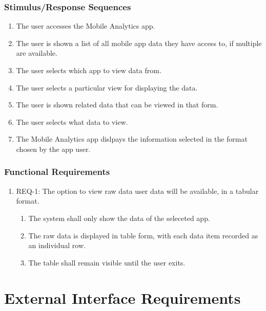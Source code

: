 \documentclass[12pt,oneside,letterpaper]{article}
\begin{document}
\subsubsection{Stimulus/Response Sequences}
\begin{enumerate}
\item The user accesses the Mobile Analytics app.
\item The user is shown a list of all mobile app data they have access to, if multiple are available.
\item The user selects which app to view data from.
\item The user selects a particular view for displaying the data.
\item The user is shown related data that can be viewed in that form.
\item The user selects what data to view.
\item The Mobile Analytics app dislpays the information selected in the format chosen by the app user.
\end{enumerate}

\subsubsection{Functional Requirements}
\begin{enumerate}
\item REQ-1: The option to view raw data user data will be available, in a tabular format.
\begin{enumerate}
\item The system shall only show the data of the seleceted app.
\item The raw data is displayed in table form, with each data item recorded as an individual row.
\item The table shall remain visible until the user exits.
\end{enumerate}
\end{enumerate}

\clearpage
\section{External Interface Requirements}
\end{document}
